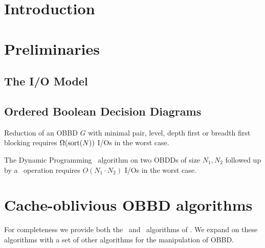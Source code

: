\section{Introduction} \label{sec:intro}

\section{Preliminaries} \label{sec:preliminaries}

\subsection{The I/O Model}

\subsection{Ordered Boolean Decision Diagrams}

\begin{theorem} \label{thm:reduce_io_lower_bound}

  Reduction of an OBBD $G$ with minimal pair, level, depth first or breadth
  first blocking requires $\Omega(\text{sort}(N))$ I/Os in the worst case.
\end{theorem}

\begin{theorem} \label{thm:apply_io_worst_case}

  The Dynamic Programming \Apply\ algorithm on two OBDDs of size $N_1, N_2$
  followed up by a \Reduce\ operation requires $O(N_1 \cdot N_2)$ I/Os in the
  worst case.
\end{theorem}


\newpage
\section{Cache-oblivious OBBD algorithms} \label{sec:theory}

For completeness we provide both the \Reduce\ and \Apply\ algorithms of
\cite{Arge96}. We expand on these algorithms with a set of other algorithms for
the manipulation of OBBD.

